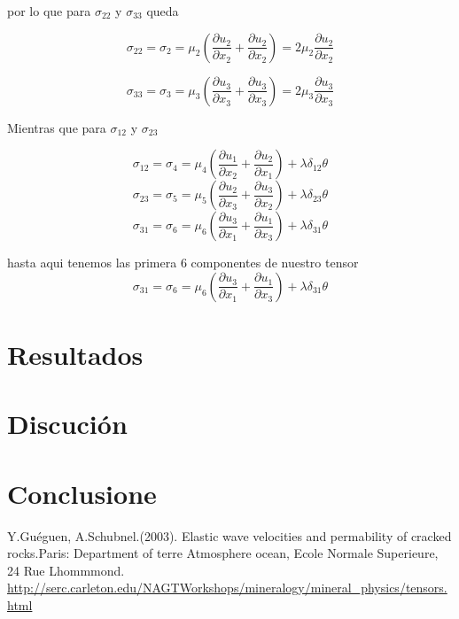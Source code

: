 \documentclass{article}
\begin{document}
por lo que para $\sigma_{22}$ y $\sigma_{33}$ queda 

\begin{equation}
 \sigma_{22}=\sigma_{2}= \mu_{2}(\dfrac{\partial u_{2}}{\partial x_{2}} + \dfrac{\partial u_{2}}{\partial x_{2}})= 2\mu_{2}\dfrac{\partial u_{2}}{\partial x_{2}}
\end{equation}

\begin{equation}
 \sigma_{33}=\sigma_{3}= \mu_{3} (\dfrac{\partial u_{3}}{\partial x_{3}} + \dfrac{\partial u_{3}}{\partial x_{3}}) = 2\mu_{3} \dfrac{\partial u_{3}}{\partial x_{3}}
\end{equation}

Mientras  que  para $\sigma_{12}$ y $\sigma_{23}$

\begin{equation}
 \sigma_{12}=\sigma_{4}= \mu_{4}(\dfrac{\partial u_{1}}{\partial x_{2}} + \dfrac{\partial u_{2}}{\partial x_{1}})+ \lambda \delta_{12}\theta
\end{equation}
\begin{equation}
 \sigma_{23}=\sigma_{5}= \mu_{5}(\dfrac{\partial u_{2}}{\partial x_{3}} + \dfrac{\partial u_{3}}{\partial x_{2}})+ \lambda \delta_{23}\theta
\end{equation}
\begin{equation}
 \sigma_{31}=\sigma_{6}= \mu_{6}(\dfrac{\partial u_{3}}{\partial x_{1}} + \dfrac{\partial u_{1}}{\partial x_{3}})+ \lambda \delta_{31}\theta
\end{equation}

hasta  aqui tenemos las  primera 6 componentes de  nuestro tensor  
\begin{equation}
 \sigma_{31}=\sigma_{6}= \mu_{6}(\dfrac{\partial u_{3}}{\partial x_{1}} + \dfrac{\partial u_{1}}{\partial x_{3}})+ \lambda \delta_{31}\theta
\end{equation}

\section{Resultados}
\section{Discuci\'on}
\section{Conclusione}

\begin{thebibliography}{90}
 Y.Gu\'eguen, A.Schubnel.(2003). Elastic wave velocities and permability of cracked rocks.Paris: Department of terre Atmosphere ocean, Ecole Normale Superieure, 24 Rue Lhommmond.
 \url{http://serc.carleton.edu/NAGTWorkshops/mineralogy/mineral_physics/tensors.html} 
\end{thebibliography}
\end{document}
